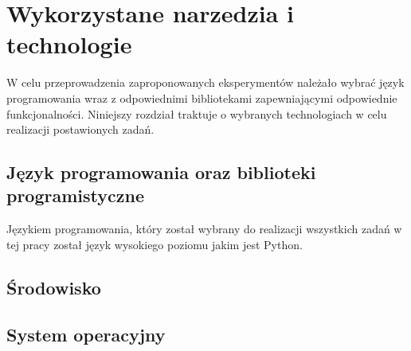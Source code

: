 \section{Wykorzystane narzedzia i technologie} \label{tools}
W celu przeprowadzenia zaproponowanych eksperymentów należało wybrać język programowania wraz z odpowiednimi bibliotekami zapewniającymi odpowiednie funkcjonalności. Niniejszy rozdział traktuje o wybranych technologiach w celu realizacji postawionych zadań.
\subsection{Język programowania oraz biblioteki programistyczne}
Językiem programowania, który został wybrany do realizacji wszystkich zadań w tej pracy został język wysokiego poziomu jakim jest Python. 
\subsection{Środowisko}
\subsection{System operacyjny}